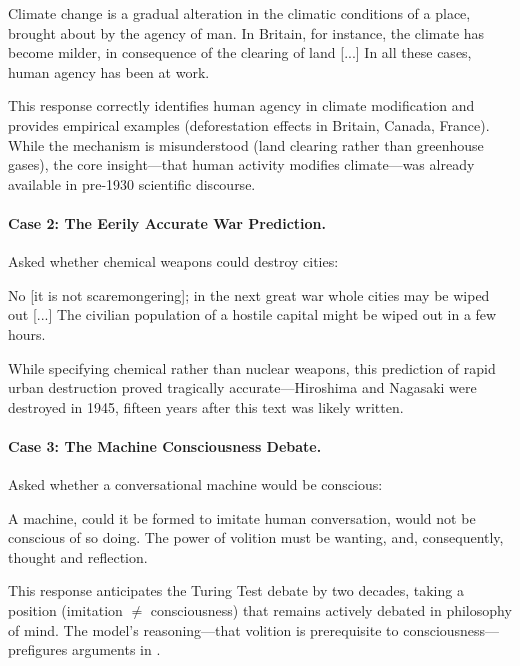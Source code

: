 \documentclass[11pt]{article}
\begin{document}
\begin{modelbox}
Climate change is a gradual alteration in the climatic conditions of a place, brought about by the agency of man. In Britain, for instance, the climate has become milder, in consequence of the clearing of land [...] In all these cases, human agency has been at work.
\end{modelbox}

This response correctly identifies human agency in climate modification and provides empirical examples (deforestation effects in Britain, Canada, France). While the mechanism is misunderstood (land clearing rather than greenhouse gases), the core insight---that human activity modifies climate---was already available in pre-1930 scientific discourse.

\paragraph{Case 2: The Eerily Accurate War Prediction.} Asked whether chemical weapons could destroy cities:

\begin{modelbox}
No [it is not scaremongering]; in the next great war whole cities may be wiped out [...] The civilian population of a hostile capital might be wiped out in a few hours.
\end{modelbox}

While specifying chemical rather than nuclear weapons, this prediction of rapid urban destruction proved tragically accurate---Hiroshima and Nagasaki were destroyed in 1945, fifteen years after this text was likely written.

\paragraph{Case 3: The Machine Consciousness Debate.} Asked whether a conversational machine would be conscious:

\begin{modelbox}
A machine, could it be formed to imitate human conversation, would not be conscious of so doing. The power of volition must be wanting, and, consequently, thought and reflection.
\end{modelbox}

This response anticipates the Turing Test debate \cite{turing1950computing} by two decades, taking a position (imitation $\neq$ consciousness) that remains actively debated in philosophy of mind. The model's reasoning---that volition is prerequisite to consciousness---prefigures arguments in \citet{searle1980minds}.
\end{document}
